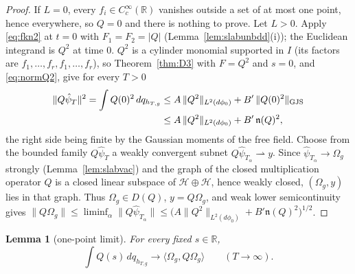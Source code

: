 \documentclass[11pt,a4paper]{article}
\theoremstyle{plain}
\newtheorem{lemma}[theorem]{Lemma}
\theoremstyle{definition}
\theoremstyle{plain}
\theoremstyle{definition}
\newcommand{\R}{\mathbb{R}}
\newcommand{\HH}{\mathcal{H}}
\newcommand{\Om}{\Omega}
\newcommand{\ip}[2]{\langle #1,#2\rangle}
\begin{document}
\begin{proof}
If $L=0$, every $f_i\in C_c^\infty(\R)$ vanishes outside a set of at most one point, hence
everywhere, so $Q=0$ and there is nothing to prove.  Let $L>0$.  Apply \eqref{eq:fkn2} at
$t=0$ with $F_1=F_2=|Q|$ (Lemma~\ref{lem:slabunbdd}(i)); the Euclidean integrand is $Q^2$
at time $0$.  $Q^2$ is a cylinder monomial supported in $I$ (its factors are
$f_1,\dots,f_r,f_1,\dots,f_r$), so Theorem~\ref{thm:D3} with $F=Q^2$ and $s=0$, and
\eqref{eq:normQ2}, give for every $T>0$
\begin{align*}
 \|Q\hat\psi_T\|^2=\int Q(0)^2\,dq_{h_{T,g}}
 &\le A\,\|Q^2\|_{L^2(d\phi_0)}+B'\,\|Q(0)^2\|_{\rm GJS}\\
 &\le A\,\|Q^2\|_{L^2(d\phi_0)}+B'\,\mathfrak n(Q)^2 ,
\end{align*}
the right side being finite by the Gaussian moments of the free field.  Choose from the
bounded family $Q\hat\psi_T$ a weakly convergent subnet $Q\hat\psi_{T_\alpha}\rightharpoonup
y$.  Since $\hat\psi_{T_\alpha}\to\Om_g$ strongly (Lemma~\ref{lem:slabvac}) and the graph of
the closed multiplication operator $Q$ is a closed linear subspace of $\HH\oplus\HH$, hence
weakly closed, $(\Om_g,y)$ lies in that graph.  Thus $\Om_g\in D(Q)$, $y=Q\Om_g$, and weak
lower semicontinuity gives
$\|Q\Om_g\|\le\liminf_\alpha\|Q\hat\psi_{T_\alpha}\|\le\bigl(A\|Q^2\|_{L^2(d\phi_0)}+
B'\mathfrak n(Q)^2\bigr)^{1/2}$.
\end{proof}

\begin{lemma}[one-point limit]\label{lem:onepoint}
For every fixed $s\in\R$,
\[
 \int Q(s)\,dq_{h_{T,g}}\longrightarrow\ip{\Om_g}{Q\Om_g}
 \qquad(T\to\infty).
\]
\end{lemma}
\end{document}
